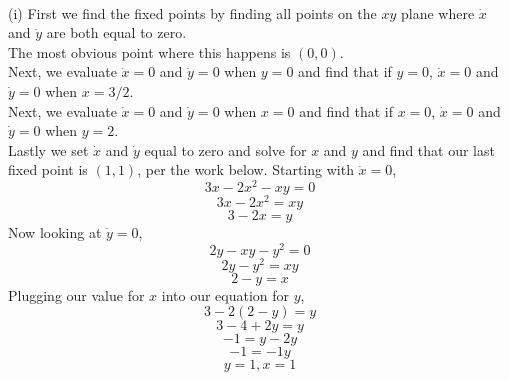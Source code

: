 \documentclass[11pt,answers]{exam}
\begin{document}
\begin{questions}
\begin{solution} \\ (i) First we find the fixed points by finding all points on the $xy$ plane where $\dot{x}$ and $\dot{y}$ are both equal to zero. \\
The most obvious point where this happens is $(0,0)$. \\
Next, we evaluate $\dot{x} = 0$ and $\dot{y} = 0$ when $y = 0$ and find that if $y = 0$, $\dot{x} = 0$ and $\dot{y} = 0$ when $x = 3/2$. \\
Next, we evaluate $\dot{x} = 0$ and $\dot{y} = 0$ when $x = 0$ and find that if $x = 0$, $\dot{x} = 0$ and $\dot{y} = 0$ when $y = 2$. \\
Lastly we set $\dot{x}$ and $\dot{y}$ equal to zero and solve for $x$ and $y$ and find that our last fixed point is $(1,1)$, per the work below. 
Starting with $\dot{x} =  0$,
\begin{equation}
3x-2x^{2}-xy = 0
\end{equation}
\begin{equation}
3x-2x^{2} = xy
\end{equation}
\begin{equation}
3 - 2x = y
\end{equation}
Now looking at $\dot{y} = 0$,
\begin{equation}
2y - xy - y^{2} = 0
\end{equation}
\begin{equation}
2y - y^{2} = xy
\end{equation}
\begin{equation}
2 - y = x
\end{equation}
Plugging our value for $x$ into our equation for $y$,
\begin{equation}
3 - 2 (2-y) = y 
\end{equation}
\begin{equation}
3 - 4 + 2y = y 
\end{equation}
\begin{equation}
-1 = y - 2y 
\end{equation}
\begin{equation}
-1 = -1y 
\end{equation}
\begin{equation}
y = 1, x = 1 
\end{equation}


\end{solution}
\end{questions}
\end{document}
